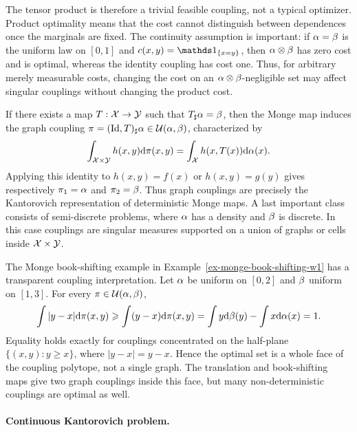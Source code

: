 The tensor product is therefore a trivial feasible coupling, not a typical optimizer. Product optimality means that the cost cannot distinguish between dependences once the marginals are fixed. The continuity assumption is important: if $\alpha=\beta$ is the uniform law on $[0,1]$ and $c(x,y)=\ones_{\{x=y\}}$, then $\alpha\otimes\beta$ has zero cost and is optimal, whereas the identity coupling has cost one. Thus, for arbitrary merely measurable costs, changing the cost on an $\alpha\otimes\beta$-negligible set may affect singular couplings without changing the product cost.

If there exists a map $T:\mathcal{X}\to\mathcal{Y}$ such that $T_\sharp\alpha=\beta$, then the Monge map induces the graph coupling $\pi=(\mathrm{Id},T)_\sharp\alpha\in\mathcal{U}(\alpha,\beta)$, characterized by
\[
	\int_{\mathcal{X}\times\mathcal{Y}} h(x,y)\mathrm{d}\pi(x,y)
	=
	\int_{\mathcal{X}} h(x,T(x))\mathrm{d}\alpha(x).
\]
Applying this identity to $h(x,y)=f(x)$ or $h(x,y)=g(y)$ gives respectively $\pi_1=\alpha$ and $\pi_2=\beta$. Thus graph couplings are precisely the Kantorovich representation of deterministic Monge maps.
A last important class consists of semi-discrete problems, where $\alpha$ has a density and $\beta$ is discrete. In this case couplings are singular measures supported on a union of graphs or cells inside $\mathcal{X}\times\mathcal{Y}$.

\begin{rem}\label{rem-kantorovich-book-shifting}
	The Monge book-shifting example in Example~\ref{ex-monge-book-shifting-w1} has a transparent coupling interpretation. Let $\alpha$ be uniform on $[0,2]$ and $\beta$ uniform on $[1,3]$. For every $\pi\in\mathcal{U}(\alpha,\beta)$,
	\[
		\int |y-x|\mathrm{d}\pi(x,y)
		\geqslant
		\int (y-x)\mathrm{d}\pi(x,y)
		=
		\int y\mathrm{d}\beta(y)-\int x\mathrm{d}\alpha(x)
		=1.
	\]
	Equality holds exactly for couplings concentrated on the half-plane $\{(x,y):y\geq x\}$, where $|y-x|=y-x$. Hence the optimal set is a whole face of the coupling polytope, not a single graph. The translation and book-shifting maps give two graph couplings inside this face, but many non-deterministic couplings are optimal as well.
\end{rem}

\paragraph{Continuous Kantorovich problem.}


